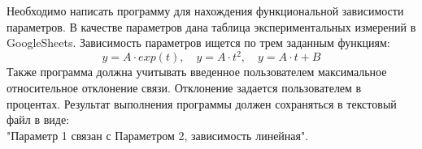 \newpage
\section*{}
Необходимо написать программу для нахождения функциональной зависимости параметров. В качестве параметров дана таблица экспериментальных измерений в GoogleSheets. Зависимость параметров ищется по трем заданным функциям:
$$ y = A \cdot exp(t), \quad y = A \cdot t^2, \quad y = A \cdot t + B $$
Также программа должна учитывать введенное пользователем максимальное относительное отклонение связи. Отклонение задается пользователем в процентах. Результат выполнения программы должен сохраняться в текстовый файл в виде:\\
"Параметр 1 связан с Параметром 2, зависимость линейная".
